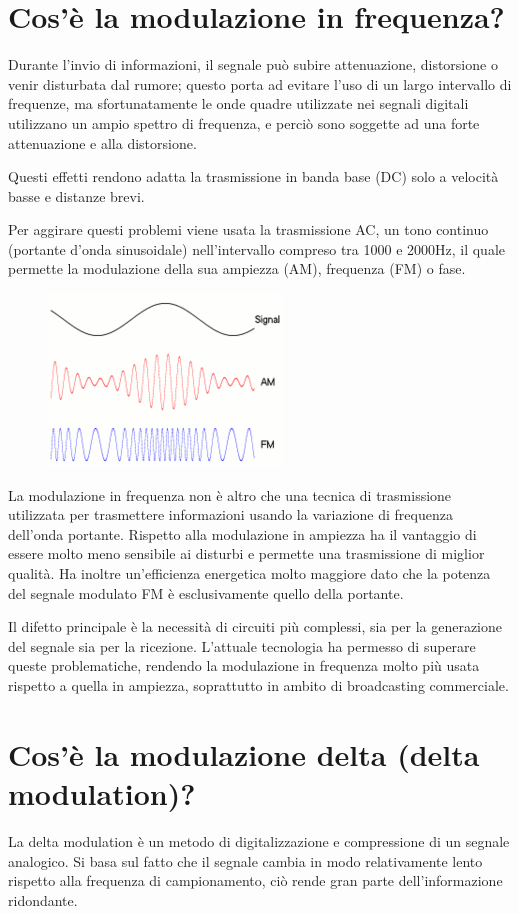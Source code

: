 \section{Cos’è la modulazione in frequenza?}
Durante l’invio di informazioni, il segnale può subire attenuazione, distorsione o venir disturbata dal rumore; questo porta ad evitare l’uso di un largo intervallo di frequenze, ma sfortunatamente le onde quadre utilizzate nei segnali digitali utilizzano un ampio spettro di frequenza, e perciò sono soggette ad una forte attenuazione e alla distorsione.

Questi effetti rendono adatta la trasmissione in banda base (DC) solo a velocità basse e distanze brevi.

Per aggirare questi problemi viene usata la trasmissione AC, un tono continuo (portante d’onda sinusoidale) nell’intervallo compreso tra 1000 e 2000Hz, il quale permette la modulazione della sua ampiezza (AM), frequenza (FM) o fase.

\begin{figure}[H]
\centering
\includegraphics[scale=1]{res/img/5_modulazione.png}
\end{figure}

La modulazione in frequenza non è altro che una tecnica di trasmissione utilizzata per trasmettere informazioni usando la variazione di frequenza dell’onda portante. Rispetto alla modulazione in ampiezza ha il vantaggio di essere molto meno sensibile ai disturbi e permette una trasmissione di miglior qualità. Ha inoltre un’efficienza energetica molto maggiore dato che la potenza del segnale modulato FM è esclusivamente quello della portante.

Il difetto principale è la necessità di circuiti più complessi, sia per la generazione del segnale sia per la ricezione. L’attuale tecnologia ha permesso di superare queste problematiche, rendendo la modulazione in frequenza molto più usata rispetto a quella in ampiezza, soprattutto in ambito di broadcasting commerciale.

\section{Cos’è la modulazione delta (delta modulation)?}
La delta modulation è un metodo di digitalizzazione e compressione di un segnale analogico.
Si basa sul fatto che il segnale cambia in modo relativamente lento rispetto alla frequenza di campionamento, ciò rende gran parte dell’informazione ridondante.

